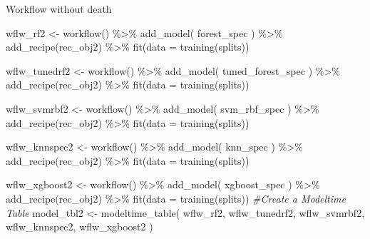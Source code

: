 \documentclass[
]{article}
\newenvironment{Shaded}{\begin{snugshade}}{\end{snugshade}}
\newcommand{\AttributeTok}[1]{\textcolor[rgb]{0.77,0.63,0.00}{#1}}
\newcommand{\CommentTok}[1]{\textcolor[rgb]{0.56,0.35,0.01}{\textit{#1}}}
\newcommand{\FunctionTok}[1]{\textcolor[rgb]{0.00,0.00,0.00}{#1}}
\newcommand{\NormalTok}[1]{#1}
\newcommand{\OtherTok}[1]{\textcolor[rgb]{0.56,0.35,0.01}{#1}}
\newcommand{\SpecialCharTok}[1]{\textcolor[rgb]{0.00,0.00,0.00}{#1}}
\begin{document}
Workflow without death

\begin{Shaded}
\begin{Highlighting}[]
\NormalTok{wflw\_rf2 }\OtherTok{\textless{}{-}} \FunctionTok{workflow}\NormalTok{() }\SpecialCharTok{\%\textgreater{}\%}
    \FunctionTok{add\_model}\NormalTok{(}
\NormalTok{        forest\_spec}
\NormalTok{    ) }\SpecialCharTok{\%\textgreater{}\%}
    \FunctionTok{add\_recipe}\NormalTok{(rec\_obj2) }\SpecialCharTok{\%\textgreater{}\%}
    \FunctionTok{fit}\NormalTok{(}\AttributeTok{data =} \FunctionTok{training}\NormalTok{(splits))}

\NormalTok{wflw\_tunedrf2 }\OtherTok{\textless{}{-}} \FunctionTok{workflow}\NormalTok{() }\SpecialCharTok{\%\textgreater{}\%}
    \FunctionTok{add\_model}\NormalTok{(}
\NormalTok{        tuned\_forest\_spec}
\NormalTok{    ) }\SpecialCharTok{\%\textgreater{}\%}
    \FunctionTok{add\_recipe}\NormalTok{(rec\_obj2) }\SpecialCharTok{\%\textgreater{}\%}
    \FunctionTok{fit}\NormalTok{(}\AttributeTok{data =} \FunctionTok{training}\NormalTok{(splits))}

\NormalTok{wflw\_svmrbf2 }\OtherTok{\textless{}{-}} \FunctionTok{workflow}\NormalTok{() }\SpecialCharTok{\%\textgreater{}\%}
    \FunctionTok{add\_model}\NormalTok{(}
\NormalTok{        svm\_rbf\_spec}
\NormalTok{    ) }\SpecialCharTok{\%\textgreater{}\%}
    \FunctionTok{add\_recipe}\NormalTok{(rec\_obj2) }\SpecialCharTok{\%\textgreater{}\%}
    \FunctionTok{fit}\NormalTok{(}\AttributeTok{data =} \FunctionTok{training}\NormalTok{(splits))}

\NormalTok{wflw\_knnspec2 }\OtherTok{\textless{}{-}} \FunctionTok{workflow}\NormalTok{() }\SpecialCharTok{\%\textgreater{}\%}
    \FunctionTok{add\_model}\NormalTok{(}
\NormalTok{        knn\_spec}
\NormalTok{    ) }\SpecialCharTok{\%\textgreater{}\%}
    \FunctionTok{add\_recipe}\NormalTok{(rec\_obj2) }\SpecialCharTok{\%\textgreater{}\%}
    \FunctionTok{fit}\NormalTok{(}\AttributeTok{data =} \FunctionTok{training}\NormalTok{(splits)) }

\NormalTok{wflw\_xgboost2 }\OtherTok{\textless{}{-}} \FunctionTok{workflow}\NormalTok{() }\SpecialCharTok{\%\textgreater{}\%}
    \FunctionTok{add\_model}\NormalTok{(}
\NormalTok{        xgboost\_spec}
\NormalTok{    ) }\SpecialCharTok{\%\textgreater{}\%}
    \FunctionTok{add\_recipe}\NormalTok{(rec\_obj2) }\SpecialCharTok{\%\textgreater{}\%}
    \FunctionTok{fit}\NormalTok{(}\AttributeTok{data =} \FunctionTok{training}\NormalTok{(splits))  }
\CommentTok{\#Create a Modeltime Table}
\NormalTok{model\_tbl2 }\OtherTok{\textless{}{-}} \FunctionTok{modeltime\_table}\NormalTok{(}
\NormalTok{    wflw\_rf2,}
\NormalTok{    wflw\_tunedrf2,}
\NormalTok{    wflw\_svmrbf2,}
\NormalTok{    wflw\_knnspec2,}
\NormalTok{    wflw\_xgboost2}
\NormalTok{)}
\end{Highlighting}
\end{Shaded}
\end{document}
